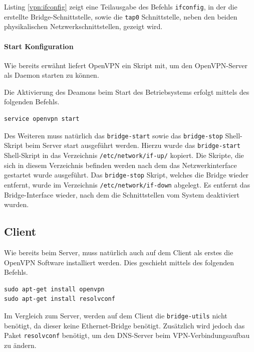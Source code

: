 

Listing \ref{vpn:ifconfig} zeigt eine Teilausgabe des Befehls \texttt{ifconfig}, in der die erstellte Bridge-Schnittstelle, sowie die \texttt{tap0} Schnittstelle, neben den beiden physikalischen Netzwerkschnittstellen, gezeigt wird.

\paragraph{Start Konfiguration}

Wie bereits erwähnt liefert OpenVPN ein Skript mit, um den OpenVPN-Server als Daemon starten zu können.

Die Aktivierung des Deamons beim Start des Betriebsystems erfolgt mittels des folgenden Befehls.

\begin{lstlisting}
service openvpn start
\end{lstlisting}

Des Weiteren muss natürlich das \texttt{bridge-start} sowie das \texttt{bridge-stop} Shell-Skript beim Server start ausgeführt werden. 
Hierzu wurde das \texttt{bridge-start} Shell-Skript in das Verzeichnis \texttt{/etc/network/if-up/} kopiert. Die Skripte, die sich in diesem Verzeichnis befinden werden nach dem das Netzwerkinterface gestartet wurde ausgeführt. Das \texttt{bridge-stop} Skript, welches die Bridge wieder entfernt, wurde im Verzeichnis \texttt{/etc/network/if-down} abgelegt. Es entfernt das Bridge-Interface wieder, nach dem die Schnittstellen vom System deaktiviert wurden.

\subsection{Client}\label{vpn:client}

Wie bereits beim Server, muss natürlich auch auf dem Client als erstes die OpenVPN Software installiert werden. Dies geschieht mittels des folgenden Befehls.

\begin{lstlisting}
sudo apt-get install openvpn
sudo apt-get install resolvconf
\end{lstlisting}

Im Vergleich zum Server, werden auf dem Client die \texttt{bridge-utils} nicht benötigt, da dieser keine Ethernet-Bridge benötigt. Zusätzlich wird jedoch das Paket \texttt{resolvconf} benötigt, um den DNS-Server beim VPN-Verbindungsaufbau zu ändern.

